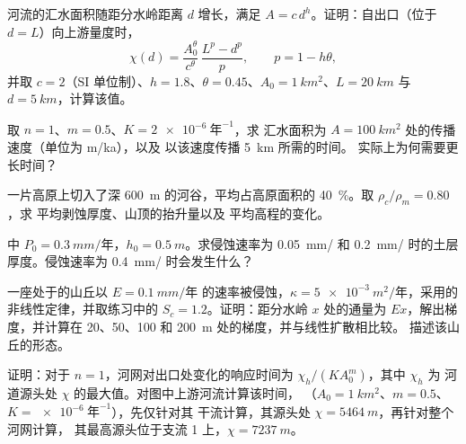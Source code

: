 \begin{exercise}[$\star\star$]\label{exo:b3:quantitative-geomorphology:6}
河流的汇水面积随距分水岭距离 $d$ 增长，满足 $A =
c\,d^{h}$。证明：自出口（位于 $d = L$）向上游量度时，
\[
\chi(d) = \frac{A_0^{\theta}}{c^{\theta}}\,\frac{L^{p} - d^{p}}{p},
\qquad p = 1 - h\theta ,
\]
并取 $c = 2$（SI 单位制）、$h = 1.8$、$\theta = 0.45$、$A_0 =
\qty{1}{km^2}$、$L = \qty{20}{km}$ 与 $d = \qty{5}{km}$，计算该值。
\end{exercise}

\begin{exercise}[$\star\star$]\label{exo:b3:quantitative-geomorphology:7}
取 $n = 1$、$m = 0.5$、$K = \qty{2e-6}{\text{年}^{-1}}$，求
汇水面积为 $A = \qty{100}{km^2}$ 处的传播速度（单位为 m/ka），以及
以该速度传播 \qty{5}{km} 所需的时间。
实际上为何需要更长时间？
\end{exercise}

\begin{exercise}[$\star\star$]\label{exo:b3:quantitative-geomorphology:8}
一片高原上切入了深 \qty{600}{m} 的河谷，平均占高原面积的
\qty{40}{\percent}。取 $\rho_c/\rho_m = 0.80$，求
平均剥蚀厚度、山顶的抬升量以及
平均高程的变化。
\end{exercise}

\begin{exercise}[$\star\star$]\label{exo:b3:quantitative-geomorphology:9}
中 $P_0 = \qty{0.3}{mm/\text{年}}$，$h_0 =
\qty{0.5}{m}$。求侵蚀速率为
\qty{0.05}{mm/} 和 \qty{0.2}{mm/} 时的土层厚度。侵蚀速率为
\qty{0.4}{mm/} 时会发生什么？
\end{exercise}

\begin{exercise}[$\star\star\star$]\label{exo:b3:quantitative-geomorphology:10}
一座处于的山丘以 $E = \qty{0.1}{mm/\text{年}}$ 的速率被侵蚀，$\kappa =
\qty{5e-3}{m^2/\text{年}}$，采用的非线性定律，并取练习中的
$S_c = 1.2$。证明：距分水岭 $x$ 处的通量为
$E x$，解出梯度，并计算在 20、50、100 和
\qty{200}{m} 处的梯度，并与线性扩散相比较。
描述该山丘的形态。
\end{exercise}

\begin{exercise}[$\star\star\star$]\label{exo:b3:quantitative-geomorphology:11}
证明：对于 $n = 1$，河网对出口处变化的响应时间为
$\chi_h/(K A_0^m)$，其中 $\chi_h$ 为
河道源头处 $\chi$ 的最大值。对图中上游河流计算该时间，
（$A_0 = \qty{1}{km^2}$、$m = 0.5$、$K = \qty{e-6}{\text{年}^{-1}}$），先仅针对其
干流计算，其源头处 $\chi = \qty{5464}{m}$，再针对整个河网计算，
其最高源头位于支流 1 上，$\chi = \qty{7237}{m}$。
\end{exercise}


